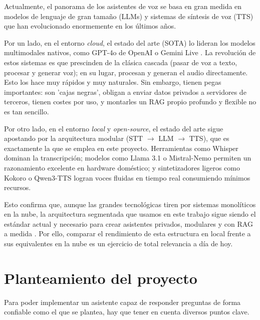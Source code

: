 \documentclass[11pt,spanish,listoffigures,listoftables]{tfgetsinf}
\begin{document}
Actualmente, el panorama de los asistentes de voz se basa en gran medida en modelos de lenguaje de gran tamaño (LLMs) y sistemas de síntesis de voz (TTS) que han evolucionado enormemente en los últimos años.

Por un lado, en el entorno \textit{cloud}, el estado del arte (SOTA) lo lideran los modelos multimodales nativos, como GPT-4o de OpenAI \cite{gpt4o-2024} o Gemini Live \cite{geminilive-2024}. La revolución de estos sistemas es que prescinden de la clásica cascada (pasar de voz a texto, procesar y generar voz); en su lugar, procesan y generan el audio directamente. Esto los hace muy rápidos y muy naturales. Sin embargo, tienen pegas importantes: son 'cajas negras', obligan a enviar datos privados a servidores de terceros, tienen costes por uso, y montarles un RAG propio profundo y flexible no es tan sencillo.

Por otro lado, en el entorno \textit{local} y \textit{open-source}, el estado del arte sigue apostando por la arquitectura modular (STT $\rightarrow$ LLM $\rightarrow$ TTS), que es exactamente la que se emplea en este proyecto. Herramientas como Whisper \cite{radford-whisper-2022} dominan la transcripción; modelos como Llama 3.1 \cite{meta-llama-3-1-2024} o Mistral-Nemo \cite{mistral-nemo-2024} permiten un razonamiento excelente en hardware doméstico; y sintetizadores ligeros como Kokoro \cite{hexgrad-kokoro-2025} o Qwen3-TTS \cite{qwen-team-2025} logran voces fluidas en tiempo real consumiendo mínimos recursos.

Esto confirma que, aunque las grandes tecnológicas tiren por sistemas monolíticos en la nube, la arquitectura segmentada que usamos en este trabajo sigue siendo el estándar actual y necesario para crear asistentes privados, modulares y con RAG a medida \cite{langchain-2025}. Por ello, comparar el rendimiento de esta estructura en local frente a sus equivalentes en la nube es un ejercicio de total relevancia a día de hoy.

\chapter{Planteamiento del proyecto}
Para poder implementar un asistente capaz de responder preguntas de forma confiable como el que se plantea, hay que tener en cuenta diversos puntos clave.
\end{document}
